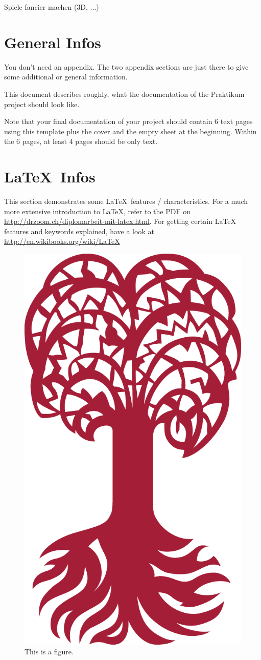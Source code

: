\documentclass{utue} %
\begin{document}
Spiele fancier machen (3D, ...)


\appendix

\section{General Infos}

You don't need an appendix. The two appendix sections are just there to give some additional or general information.

This document describes roughly, what the documentation of the Praktikum project should look like.

Note that your final documentation of your project should contain 6 text pages using this template plus the cover and the empty sheet at the beginning. Within the 6 pages, at least 4 pages should be only text.

\section{\LaTeX~Infos}

This section demonstrates some \LaTeX~features / characteristics. For a much more extensive introduction to \LaTeX, refer to the PDF on \url{http://drzoom.ch/diplomarbeit-mit-latex.html}. For getting certain LaTeX features and keywords explained, have a look at \url{http://en.wikibooks.org/wiki/LaTeX}

\begin{figure}[h!]
  \centering
  \includegraphics[width=.4\columnwidth]{images/Tuebingen_CorporateElements/UT_BM_Rot_RGB_tr_01.png}
  \caption{This is a figure.}
  \label{fig:figure1}
\end{figure}
\end{document}
